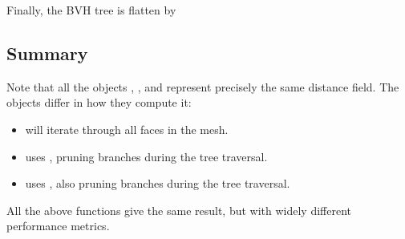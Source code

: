 \documentclass[letterpaper,10pt,english]{sphinxmanual}
\begin{document}
\sphinxAtStartPar
Finally, the BVH tree is flatten by

\begin{sphinxVerbatim}[commandchars=\\\{\}]
                                              
\end{sphinxVerbatim}


\subsection{Summary}
\label{\detokenize{Example_Basic:summary}}
\sphinxAtStartPar
Note that all the objects , , and  represent precisely the same distance field.
The objects differ in how they compute it:
\begin{itemize}
\item {} 
\sphinxAtStartPar
{} will iterate through all faces in the mesh.

\item {} 
\sphinxAtStartPar
{} uses , pruning branches during the tree traversal.

\item {} 
\sphinxAtStartPar
{} uses , also pruning branches during the tree traversal.

\end{itemize}

\sphinxAtStartPar
All the above functions give the same result, but with widely different performance metrics.

\sphinxstepscope
\end{document}

